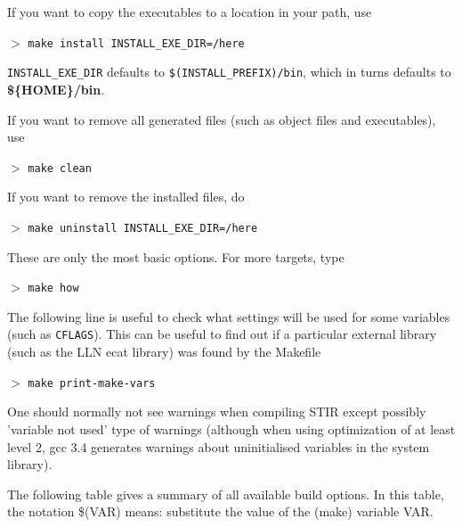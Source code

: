 \documentclass{article}
\newcommand{\cmdline}[1]{\par \noindent $>$ \texttt{#1}\par}
\begin{document}
If you want to copy the executables to a location in your path, 
use
\cmdline{make install INSTALL\_EXE\_DIR=/here}

\noindent
\texttt{INSTALL\_EXE\_DIR} defaults to \texttt{\$(INSTALL\_PREFIX)/bin}, which 
in turns defaults to \textbf{\$\{HOME\}/bin}.


If you want to remove all generated files (such as object files 
and executables), use
\cmdline{make clean}


If you want to remove the installed files, do
\cmdline{make uninstall INSTALL\_EXE\_DIR=/here}

These are only the most basic options. For more targets, 
type
\cmdline{make how}
The following line is useful to check what settings will be used for some
variables (such as \texttt{CFLAGS}). This can be useful to find out
if a particular external library (such as the LLN ecat library) was 
found by the Makefile
\cmdline{make print-make-vars}


One should normally not see warnings when compiling STIR
except possibly 'variable not used' type of warnings (although when using
optimization of at least level 2, gcc 3.4 
generates warnings about uninitialised variables in the system library).


The following table gives a summary of all available build options. 
In this table, the notation \$(VAR) means: substitute the value of the
(make) variable VAR.
\end{document}
